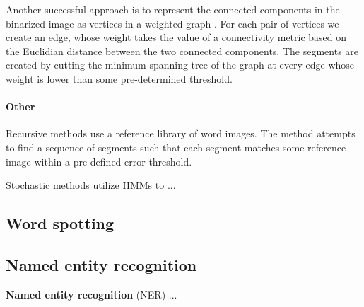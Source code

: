 Another successful approach is to represent the connected components in the binarized image as vertices in a weighted graph \cite{GraphSegmentation}.
For each pair of vertices we create an edge, whose weight takes the value of a connectivity metric based on the Euclidian distance between the two connected components.
The segments are created by cutting the minimum spanning tree of the graph at every edge whose weight is lower than some pre-determined threshold.

\paragraph{Other}

Recursive methods use a reference library of word images.
The method attempts to find a sequence of segments such that each segment matches some reference image within a pre-defined error threshold.

Stochastic methods utilize HMMs to ...



\subsection{Word spotting}


\subsection{Named entity recognition}

\textbf{Named entity recognition} (NER) ...
